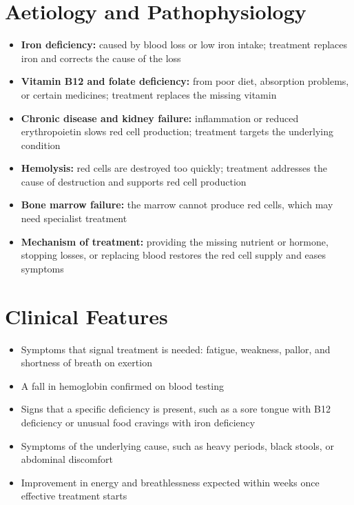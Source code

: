 \section*{Aetiology and Pathophysiology}
\begin{itemize}
    \item \textbf{Iron deficiency:} caused by blood loss or low iron intake; treatment replaces iron and corrects the cause of the loss
    \item \textbf{Vitamin B12 and folate deficiency:} from poor diet, absorption problems, or certain medicines; treatment replaces the missing vitamin
    \item \textbf{Chronic disease and kidney failure:} inflammation or reduced erythropoietin slows red cell production; treatment targets the underlying condition
    \item \textbf{Hemolysis:} red cells are destroyed too quickly; treatment addresses the cause of destruction and supports red cell production
    \item \textbf{Bone marrow failure:} the marrow cannot produce red cells, which may need specialist treatment
    \item \textbf{Mechanism of treatment:} providing the missing nutrient or hormone, stopping losses, or replacing blood restores the red cell supply and eases symptoms
\end{itemize}

\section*{Clinical Features}
\begin{itemize}
    \item Symptoms that signal treatment is needed: fatigue, weakness, pallor, and shortness of breath on exertion
    \item A fall in hemoglobin confirmed on blood testing
    \item Signs that a specific deficiency is present, such as a sore tongue with B12 deficiency or unusual food cravings with iron deficiency
    \item Symptoms of the underlying cause, such as heavy periods, black stools, or abdominal discomfort
    \item Improvement in energy and breathlessness expected within weeks once effective treatment starts
\end{itemize}

